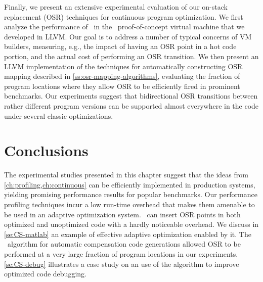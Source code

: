 Finally, we present an extensive experimental evaluation of our on-stack replacement (OSR) techniques for continuous program optimization. We first analyze the performance of \osrkit\ in the \tinyvm\ proof-of-concept virtual machine that we developed in LLVM. Our goal is to address a number of typical concerns of VM builders, measuring, e.g., the impact of having an OSR point in a hot code portion, and the actual cost of performing an OSR transition. We then present an LLVM implementation of the techniques for automatically constructing OSR mapping described in \mysection\ref{ss:osr-mapping-algorithms}, evaluating the fraction of program locations where they allow OSR to be efficiently fired in prominent benchmarks. Our experiments suggest that bidirectional OSR transitions between rather different program versions can be supported almost everywhere in the code under several classic optimizations.

\ifdefined \noauthorea



\fi

\section{Conclusions}
The experimental studies presented in this chapter suggest that the ideas from \mychapter\ref{ch:profiling,ch:continuous} can be efficiently implemented in production systems, yielding promising performance results for popular benchmarks. Our performance profiling techniques incur a low run-time overhead that makes them amenable to be used in an adaptive optimization system. \osrkit\ can insert OSR points in both optimized and unoptimized code with a hardly noticeable overhead. We discuss in \mysection\ref{se:CS-matlab} an example of effective adaptive optimization enabled by it. The \buildcomp\ algorithm for automatic compensation code generations allowed OSR to be performed at a very large fraction of program locations in our experiments. \mysection\ref{se:CS-debug} illustrates a case study on an use of the algorithm to improve optimized code debugging.
